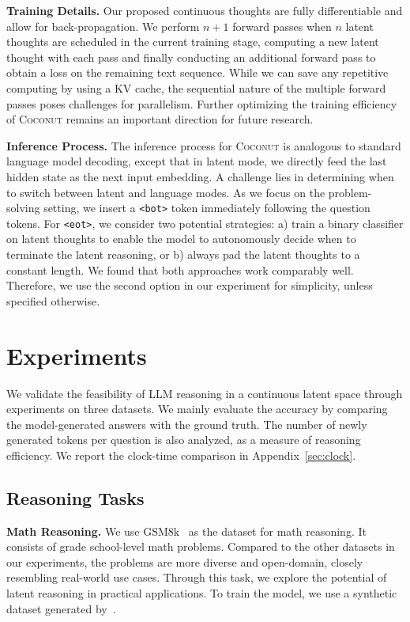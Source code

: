 \documentclass[]{fairmeta}
\newcommand{\ours}{\textsc{Coconut}\xspace}
\begin{document}
\textbf{Training Details.} Our proposed continuous thoughts are fully differentiable and allow for back-propagation. We perform $n+1$ forward passes when $n$ latent thoughts are scheduled in the current training stage, computing a new latent thought with each pass and finally conducting an additional forward pass to obtain a loss on the remaining text sequence. While we can save any repetitive computing by using a KV cache, the sequential nature of the multiple forward passes poses challenges for parallelism. Further optimizing the training efficiency of \ours remains an important direction for future research.


\noindent\textbf{Inference Process.} The inference process for \ours is analogous to standard language model decoding, except that in latent mode, we directly feed the last hidden state as the next input embedding. A challenge lies in determining when to switch between latent and language modes. As we focus on the problem-solving setting, we insert a \texttt{<bot>} token immediately following the question tokens. For \texttt{<eot>}, we consider two potential strategies: a) train a binary classifier on latent thoughts to enable the model to autonomously decide when to terminate the latent reasoning, or b) always pad the latent thoughts to a constant length. We found that both approaches work comparably well. Therefore, we use the second option in our experiment for simplicity, unless specified otherwise.


\section{Experiments}
\label{sec:experiment}
We validate the feasibility of LLM reasoning in a continuous latent space through experiments on three datasets. We mainly evaluate the accuracy by comparing the model-generated answers with the ground truth. The number of newly generated tokens per question is also analyzed, as a measure of reasoning efficiency. We report the clock-time comparison in Appendix~\ref{sec:clock}.


\subsection{Reasoning Tasks}

\label{sec:prosqa}

\noindent\textbf{Math Reasoning.}
We use GSM8k~\citep{cobbe2021training} as the dataset for math reasoning. It consists of grade school-level math problems. Compared to the other datasets in our experiments, the problems are more diverse and open-domain, closely resembling real-world use cases. Through this task, we explore the potential of latent reasoning in practical applications. To train the model, we use a synthetic dataset generated by~\citet{deng2023implicit}.
\end{document}
